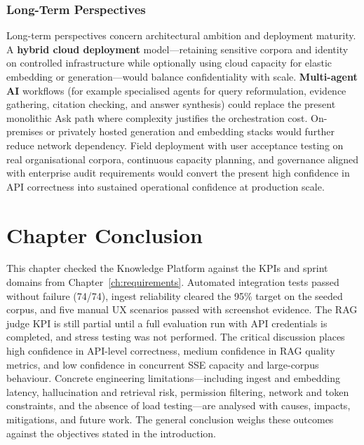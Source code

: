 \subsubsection{Long-Term Perspectives}

Long-term perspectives concern architectural ambition and deployment maturity.
A \textbf{hybrid cloud deployment} model---retaining sensitive corpora and
identity on controlled infrastructure while optionally using cloud capacity for
elastic embedding or generation---would balance confidentiality with scale.
\textbf{Multi-agent AI} workflows (for example specialised agents for query
reformulation, evidence gathering, citation checking, and answer synthesis) could
replace the present monolithic Ask path where complexity justifies the
orchestration cost. On-premises or privately hosted generation and embedding
stacks would further reduce network dependency. Field deployment with user
acceptance testing on real organisational corpora, continuous capacity planning,
and governance aligned with enterprise audit requirements would convert the
present high confidence in API correctness into sustained operational confidence
at production scale.

\section{Chapter Conclusion}

This chapter checked the Knowledge Platform against the KPIs and sprint domains
from Chapter~\ref{ch:requirements}. Automated integration tests passed without
failure (74/74), ingest reliability cleared the 95\% target on the seeded corpus,
and five manual UX scenarios passed with screenshot evidence.
The RAG judge KPI is still partial until a full evaluation run with API credentials
is completed, and stress testing was not performed. The critical discussion places
high confidence in API-level correctness, medium confidence in RAG quality metrics,
and low confidence in concurrent SSE capacity and large-corpus behaviour. Concrete
engineering limitations---including ingest and embedding latency, hallucination and
retrieval risk, permission filtering, network and token constraints, and the absence
of load testing---are analysed with causes, impacts, mitigations, and future work.
The general conclusion weighs these outcomes against the objectives stated in the
introduction.
